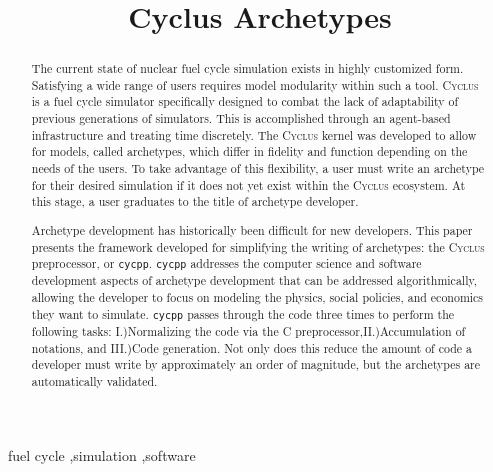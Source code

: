 \documentclass[review]{elsarticle}
\date{}
\newcommand{\code}[1]{\lstinline[basicstyle=\ttfamily\color{green!40!black}]|#1|}
\newcommand{\cyclus}{\textsc{Cyclus}\xspace}
\newcommand{\Cyclus}{\cyclus}
\newcommand{\cycpp}{\code{cycpp}\xspace}
\begin{document}
\begin{frontmatter}
\title{Cyclus Archetypes}







\begin{abstract}
The current state of nuclear fuel cycle simulation exists in highly 
customized form. Satisfying a wide range of users requires model modularity 
within such a tool. \Cyclus is a fuel cycle simulator specifically designed to 
combat the lack of adaptability of previous generations of simulators. This is
accomplished through an agent-based infrastructure and treating time 
discretely. The \Cyclus kernel was developed to allow for models, called 
archetypes, which differ in fidelity and function depending on the needs of the users. 
To take advantage of this flexibility, a user must write an archetype for 
their desired simulation if it does not yet exist within the \Cyclus ecosystem.
At this stage, a user graduates to the title of archetype developer.

Archetype development has historically been difficult for new developers.
This paper presents the framework developed for simplifying the writing of 
archetypes: the \Cyclus preprocessor, or \cycpp. \cycpp addresses the computer 
science and software development aspects of archetype development
that can be addressed algorithmically, allowing the developer to focus on 
modeling the physics, social policies, and economics they want to simulate. \cycpp passes through 
the code three times to perform the following tasks: I.)Normalizing the code via 
the C preprocessor,II.)Accumulation of notations, and III.)Code generation. Not only
does this reduce the amount of code a developer must write by approximately 
an order of magnitude, but the archetypes are automatically validated.
\end{abstract}

\begin{keyword}
fuel cycle \sep simulation \sep software
\end{keyword}

\end{frontmatter}








\begin{appendix}


\end{appendix}

\newpage


\end{document}
